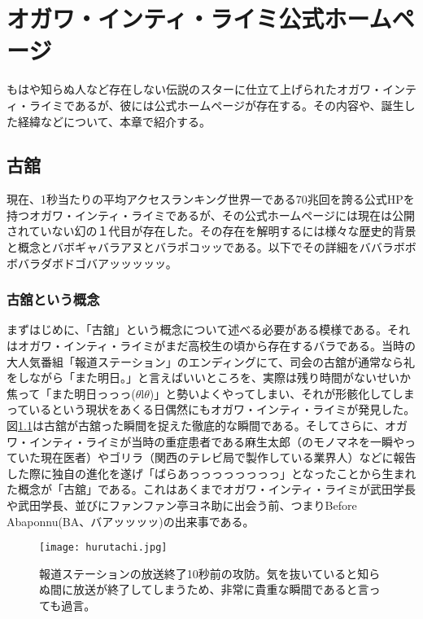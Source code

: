 
\chapter{オガワ・インティ・ライミ公式ホームページ}

もはや知らぬ人など存在しない伝説のスターに仕立て上げられたオガワ・インティ・ライミであるが、彼には公式ホームページが存在する。その内容や、誕生した経緯などについて、本章で紹介する。

\section{古舘}

現在、1秒当たりの平均アクセスランキング世界一である70兆回を誇る公式HPを持つオガワ・インティ・ライミであるが、その公式ホームページには現在は公開されていない幻の１代目が存在した。その存在を解明するには様々な歴史的背景と概念とバボギャバラアヌとバラポコッッである。以下でその詳細をババラボボボバラダボドゴバアッッッッッ。

\subsection{古舘という概念}

まずはじめに、「古舘」という概念について述べる必要がある模様である。それはオガワ・インティ・ライミがまだ高校生の頃から存在するバラである。当時の大人気番組「報道ステーション」のエンディングにて、司会の古舘が通常なら礼をしながら「また明日。」と言えばいいところを、実際は残り時間がないせいか焦って「また明日っっっ($\theta$l$\theta$)」と勢いよくやってしまい、それが形骸化してしまっているという現状をあくる日偶然にもオガワ・インティ・ライミが発見した。図\ref{hurutachi}は古舘が古舘った瞬間を捉えた徹底的な瞬間である。そしてさらに、オガワ・インティ・ライミが当時の重症患者である麻生太郎（のモノマネを一瞬やっていた現在医者）やゴリラ（関西のテレビ局で製作している業界人）などに報告した際に独自の進化を遂げ「ばらあっっっっっっっっ」となったことから生まれた概念が「古舘」である。これはあくまでオガワ・インティ・ライミが武田学長や武田学長、並びにファンファン亭ヨネ助に出会う前、つまりBefore Abaponnu(BA、バアッッッッ)の出来事である。\\

\begin{figure}[H]
  \centering
  \texttt{[image: hurutachi.jpg]}
  \caption{報道ステーションの放送終了10秒前の攻防。気を抜いていると知らぬ間に放送が終了してしまうため、非常に貴重な瞬間であると言っても過言。}
\label{hurutachi}
\end{figure}


